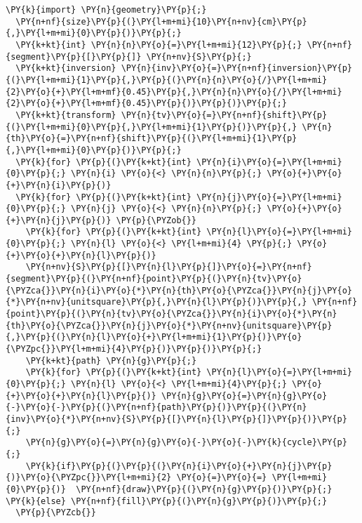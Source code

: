 \begin{Verbatim}[commandchars=\\\{\}]
  \PY{k}{import} \PY{n}{geometry}\PY{p}{;}
  \PY{n+nf}{size}\PY{p}{(}\PY{l+m+mi}{10}\PY{n+nv}{cm}\PY{p}{,}\PY{l+m+mi}{0}\PY{p}{)}\PY{p}{;}
  \PY{k+kt}{int} \PY{n}{n}\PY{o}{=}\PY{l+m+mi}{12}\PY{p}{;} \PY{n+nf}{segment}\PY{p}{[}\PY{p}{]} \PY{n+nv}{S}\PY{p}{;}
  \PY{k+kt}{inversion} \PY{n}{inv}\PY{o}{=}\PY{n+nf}{inversion}\PY{p}{(}\PY{l+m+mi}{1}\PY{p}{,}\PY{p}{(}\PY{n}{n}\PY{o}{/}\PY{l+m+mi}{2}\PY{o}{+}\PY{l+m+mf}{0.45}\PY{p}{,}\PY{n}{n}\PY{o}{/}\PY{l+m+mi}{2}\PY{o}{+}\PY{l+m+mf}{0.45}\PY{p}{)}\PY{p}{)}\PY{p}{;}
  \PY{k+kt}{transform} \PY{n}{tv}\PY{o}{=}\PY{n+nf}{shift}\PY{p}{(}\PY{l+m+mi}{0}\PY{p}{,}\PY{l+m+mi}{1}\PY{p}{)}\PY{p}{,} \PY{n}{th}\PY{o}{=}\PY{n+nf}{shift}\PY{p}{(}\PY{l+m+mi}{1}\PY{p}{,}\PY{l+m+mi}{0}\PY{p}{)}\PY{p}{;}
  \PY{k}{for} \PY{p}{(}\PY{k+kt}{int} \PY{n}{i}\PY{o}{=}\PY{l+m+mi}{0}\PY{p}{;} \PY{n}{i} \PY{o}{<} \PY{n}{n}\PY{p}{;} \PY{o}{+}\PY{o}{+}\PY{n}{i}\PY{p}{)}
  \PY{k}{for} \PY{p}{(}\PY{k+kt}{int} \PY{n}{j}\PY{o}{=}\PY{l+m+mi}{0}\PY{p}{;} \PY{n}{j} \PY{o}{<} \PY{n}{n}\PY{p}{;} \PY{o}{+}\PY{o}{+}\PY{n}{j}\PY{p}{)} \PY{p}{\PYZob{}}
    \PY{k}{for} \PY{p}{(}\PY{k+kt}{int} \PY{n}{l}\PY{o}{=}\PY{l+m+mi}{0}\PY{p}{;} \PY{n}{l} \PY{o}{<} \PY{l+m+mi}{4} \PY{p}{;} \PY{o}{+}\PY{o}{+}\PY{n}{l}\PY{p}{)}
    \PY{n+nv}{S}\PY{p}{[}\PY{n}{l}\PY{p}{]}\PY{o}{=}\PY{n+nf}{segment}\PY{p}{(}\PY{n+nf}{point}\PY{p}{(}\PY{n}{tv}\PY{o}{\PYZca{}}\PY{n}{i}\PY{o}{*}\PY{n}{th}\PY{o}{\PYZca{}}\PY{n}{j}\PY{o}{*}\PY{n+nv}{unitsquare}\PY{p}{,}\PY{n}{l}\PY{p}{)}\PY{p}{,} \PY{n+nf}{point}\PY{p}{(}\PY{n}{tv}\PY{o}{\PYZca{}}\PY{n}{i}\PY{o}{*}\PY{n}{th}\PY{o}{\PYZca{}}\PY{n}{j}\PY{o}{*}\PY{n+nv}{unitsquare}\PY{p}{,}\PY{p}{(}\PY{n}{l}\PY{o}{+}\PY{l+m+mi}{1}\PY{p}{)}\PY{o}{\PYZpc{}}\PY{l+m+mi}{4}\PY{p}{)}\PY{p}{)}\PY{p}{;}
    \PY{k+kt}{path} \PY{n}{g}\PY{p}{;}
    \PY{k}{for} \PY{p}{(}\PY{k+kt}{int} \PY{n}{l}\PY{o}{=}\PY{l+m+mi}{0}\PY{p}{;} \PY{n}{l} \PY{o}{<} \PY{l+m+mi}{4}\PY{p}{;} \PY{o}{+}\PY{o}{+}\PY{n}{l}\PY{p}{)} \PY{n}{g}\PY{o}{=}\PY{n}{g}\PY{o}{-}\PY{o}{-}\PY{p}{(}\PY{n+nf}{path}\PY{p}{)}\PY{p}{(}\PY{n}{inv}\PY{o}{*}\PY{n+nv}{S}\PY{p}{[}\PY{n}{l}\PY{p}{]}\PY{p}{)}\PY{p}{;}
    \PY{n}{g}\PY{o}{=}\PY{n}{g}\PY{o}{-}\PY{o}{-}\PY{k}{cycle}\PY{p}{;}
    \PY{k}{if}\PY{p}{(}\PY{p}{(}\PY{n}{i}\PY{o}{+}\PY{n}{j}\PY{p}{)}\PY{o}{\PYZpc{}}\PY{l+m+mi}{2} \PY{o}{=}\PY{o}{=} \PY{l+m+mi}{0}\PY{p}{)}  \PY{n+nf}{draw}\PY{p}{(}\PY{n}{g}\PY{p}{)}\PY{p}{;} \PY{k}{else} \PY{n+nf}{fill}\PY{p}{(}\PY{n}{g}\PY{p}{)}\PY{p}{;}
  \PY{p}{\PYZcb{}}
\end{Verbatim}

